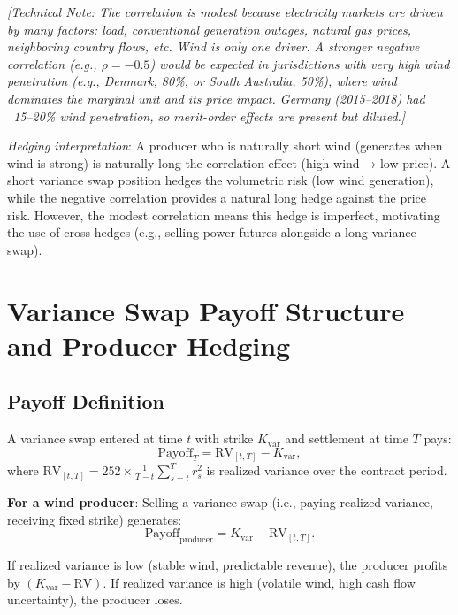 \documentclass[11pt, a4paper, twoside]{article}
\begin{document}
\textit{[Technical Note: The correlation is modest because electricity markets are driven by many factors: load, conventional generation outages, natural gas prices, neighboring country flows, etc. Wind is only one driver. A stronger negative correlation (e.g., $\rho = -0.5$) would be expected in jurisdictions with very high wind penetration (e.g., Denmark, 80\%, or South Australia, 50\%), where wind dominates the marginal unit and its price impact. Germany (2015--2018) had ~15--20\% wind penetration, so merit-order effects are present but diluted.]}

\textit{Hedging interpretation}: A producer who is naturally short wind (generates when wind is strong) is naturally long the correlation effect (high wind → low price). A short variance swap position hedges the volumetric risk (low wind generation), while the negative correlation provides a natural long hedge against the price risk. However, the modest correlation means this hedge is imperfect, motivating the use of cross-hedges (e.g., selling power futures alongside a long variance swap).

\section{Variance Swap Payoff Structure and Producer Hedging}

\subsection{Payoff Definition}

A variance swap entered at time $t$ with strike $K_{\text{var}}$ and settlement at time $T$ pays:
\begin{equation}
\text{Payoff}_T = \text{RV}_{[t,T]} - K_{\text{var}},
\end{equation}
where $\text{RV}_{[t,T]} = 252 \times \frac{1}{T-t} \sum_{s=t}^{T} r_s^2$ is realized variance over the contract period.

\textbf{For a wind producer}: Selling a variance swap (i.e., paying realized variance, receiving fixed strike) generates:
\begin{equation}
\text{Payoff}_{\text{producer}} = K_{\text{var}} - \text{RV}_{[t,T]}.
\end{equation}

If realized variance is low (stable wind, predictable revenue), the producer profits by $(K_{\text{var}} - \text{RV})$. If realized variance is high (volatile wind, high cash flow uncertainty), the producer loses.
\end{document}
